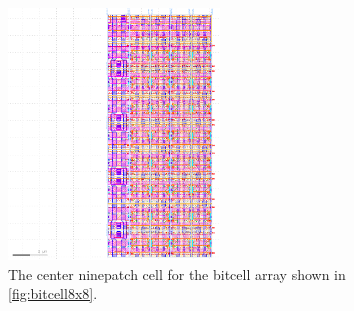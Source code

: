 \begin{figure}[H] \centering
\includegraphics[width=0.5\textwidth]{figures/bitcell_center.png}
\caption{The center ninepatch cell for the bitcell array shown in \ref{fig:bitcell8x8}. \label{fig:bitcell-center}}
\end{figure}

